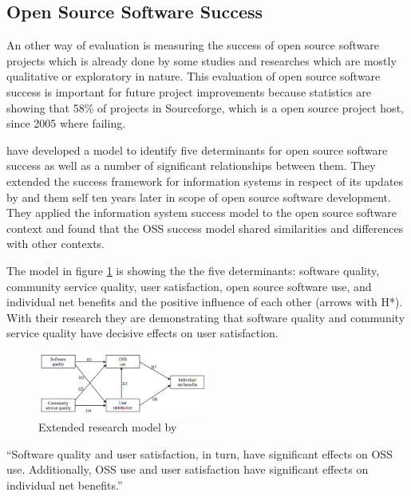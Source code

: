 \documentclass[DIV=calc,paper=a4,fontsize=9pt,twocolumn]{scrartcl}
\begin{document}
\subsection{Open Source Software Success} \label{sec:oss-success}

An other way of evaluation is measuring the success of open source software projects which is already done by some studies and researches which are mostly qualitative or exploratory in nature. This evaluation of open source software success is important for future project improvements because statistics are showing that 58\% of projects in Sourceforge, which is a open source project host, since 2005 where failing. 

\citet{lee2009measuring} have developed a model to identify five determinants for open source software success as well as a number of significant relationships between them. They extended the \citet{delone1992information} success framework for information systems in respect of its updates by \citet{seddon1997respecification} and them self ten years later in scope of open source software development. They applied the information system success model to the open source software context and found that the OSS success model shared similarities and differences with other contexts. \citep{lee2009measuring}

The model in figure \ref{fig:success-model} is showing the the five determinants: software quality, community service quality, user satisfaction, open source software use, and individual net benefits and the positive influence of each other (arrows with H*). With their research they are demonstrating that software quality and community service quality have decisive effects on user satisfaction. \citep{lee2009measuring}

\begin{figure}[ht]
    \includegraphics[width=0.5\textwidth ]{img/success-model.png}{}
    \centering
    \caption{Extended research model by \citet{lee2009measuring}}\label{fig:success-model}
\end{figure}

\enquote{Software quality and user satisfaction, in turn, have significant effects on OSS use. Additionally, OSS use and user satisfaction have significant effects on individual net benefits.} \citep{lee2009measuring}
\end{document}
